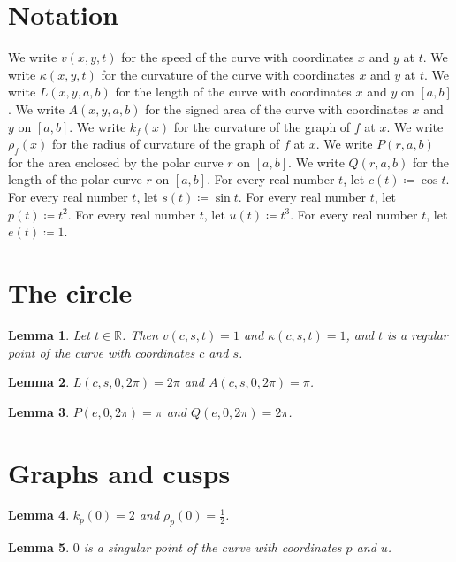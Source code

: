 \documentclass{article}
\newtheorem{lemma}{Lemma}
\begin{document}
\section{Notation}

We write $v(x,y,t)$ for the speed of the curve with coordinates $x$ and $y$ at $t$.
We write $\kappa(x,y,t)$ for the curvature of the curve with coordinates $x$ and $y$ at $t$.
We write $L(x,y,a,b)$ for the length of the curve with coordinates $x$ and $y$ on $[a,b]$.
We write $A(x,y,a,b)$ for the signed area of the curve with coordinates $x$ and $y$ on $[a,b]$.
We write $k_f(x)$ for the curvature of the graph of $f$ at $x$.
We write $\rho_f(x)$ for the radius of curvature of the graph of $f$ at $x$.
We write $P(r,a,b)$ for the area enclosed by the polar curve $r$ on $[a,b]$.
We write $Q(r,a,b)$ for the length of the polar curve $r$ on $[a,b]$.
For every real number $t$, let $c(t)\coloneqq\cos t$.
For every real number $t$, let $s(t)\coloneqq\sin t$.
For every real number $t$, let $p(t)\coloneqq t^2$.
For every real number $t$, let $u(t)\coloneqq t^3$.
For every real number $t$, let $e(t)\coloneqq 1$.

\section{The circle}

\begin{lemma}\label{circle}
Let $t\in\mathbb{R}$. Then $v(c,s,t)=1$ and $\kappa(c,s,t)=1$, and $t$ is a regular point of the curve with coordinates $c$ and $s$.
\end{lemma}

\begin{lemma}\label{length}
$L(c,s,0,2\pi)=2\pi$ and $A(c,s,0,2\pi)=\pi$.
\end{lemma}

\begin{lemma}\label{polar}
$P(e,0,2\pi)=\pi$ and $Q(e,0,2\pi)=2\pi$.
\end{lemma}

\section{Graphs and cusps}

\begin{lemma}\label{parabola}
$k_p(0)=2$ and $\rho_p(0)=\frac12$.
\end{lemma}

\begin{lemma}\label{cusp}
$0$ is a singular point of the curve with coordinates $p$ and $u$.
\end{lemma}
\end{document}
